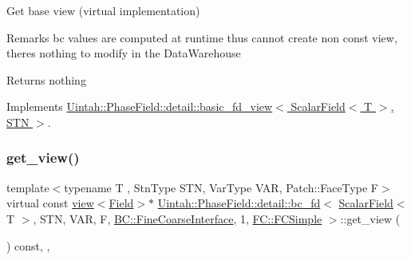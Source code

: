 Get base view (virtual implementation) 

\begin{DoxyRemark}{Remarks}
bc values are computed at runtime thus cannot create non const view, there\textquotesingle{}s nothing to modify in the Data\+Warehouse
\end{DoxyRemark}
\begin{DoxyReturn}{Returns}
nothing 
\end{DoxyReturn}


Implements \hyperlink{classUintah_1_1PhaseField_1_1detail_1_1basic__fd__view_3_01ScalarField_3_01T_01_4_00_01STN_01_4_a2bbf870b332cfd997ec5297428019bc8}{Uintah\+::\+Phase\+Field\+::detail\+::basic\+\_\+fd\+\_\+view$<$ Scalar\+Field$<$ T $>$, S\+T\+N $>$}.

\mbox{\label{classUintah_1_1PhaseField_1_1detail_1_1bc__fd_3_01ScalarField_3_01T_01_4_00_01STN_00_01VAR_00_01ce55d0bf8381798bc129da931b626e80_a68249997b8422670b8831c9b6db4d879}} 
\subsubsection{\texorpdfstring{get\+\_\+view()}{get\_view()}\hspace{0.1cm}{\footnotesize\ttfamily [2/2]}}
{\footnotesize\ttfamily template$<$typename T , Stn\+Type S\+TN, Var\+Type V\+AR, Patch\+::\+Face\+Type F$>$ \\
virtual const \hyperlink{classUintah_1_1PhaseField_1_1detail_1_1view}{view}$<$\hyperlink{structUintah_1_1PhaseField_1_1ScalarField}{Field}$>$$\ast$ \hyperlink{classUintah_1_1PhaseField_1_1detail_1_1bc__fd}{Uintah\+::\+Phase\+Field\+::detail\+::bc\+\_\+fd}$<$ \hyperlink{structUintah_1_1PhaseField_1_1ScalarField}{Scalar\+Field}$<$ T $>$, S\+TN, V\+AR, F, \hyperlink{namespaceUintah_1_1PhaseField_a148fba372aa3be96fd6eede7a2fa10b5ad2d89be9637ff8b537fa4b6026c0e574}{B\+C\+::\+Fine\+Coarse\+Interface}, 1, \hyperlink{namespaceUintah_1_1PhaseField_aeb51fe956fe07f1487f5878f4039f27ca6a316dd1139b99e2a8af86106b3cf045}{F\+C\+::\+F\+C\+Simple} $>$\+::get\+\_\+view (\begin{DoxyParamCaption}{ }\end{DoxyParamCaption}) const\hspace{0.3cm}{\ttfamily [inline]}, {\ttfamily [override]}, {\ttfamily [virtual]}}



